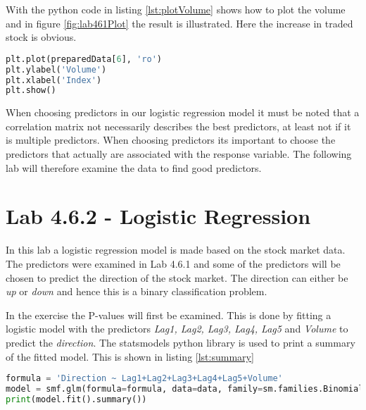 \FloatBarrier

With the python code in listing \ref{lst:plotVolume} shows how to plot the volume and in figure \ref{fig:lab461Plot} the result is illustrated. Here the increase in traded stock is obvious.
\begin{lstlisting}[language=Python, label=lst:plotVolume, caption=Plot Volume]
plt.plot(preparedData[6], 'ro')
plt.ylabel('Volume')
plt.xlabel('Index')
plt.show()
\end{lstlisting}


When choosing predictors in our logistic regression model it must be noted that a correlation matrix not necessarily describes the best predictors, at least not if it is multiple predictors. When choosing predictors its important to choose the predictors that actually are associated with the response variable. The following lab will therefore examine the data to find good predictors.

\section{Lab 4.6.2 - Logistic Regression}
\label{sec:lab462}
In this lab a logistic regression model is made based on the stock market data. The predictors were examined in Lab 4.6.1 and some of the predictors will be chosen to predict the direction of the stock market. The direction can either be \emph{up} or \emph{down} and hence this is a binary classification problem.

In the exercise the P-values will first be examined. This is done by fitting a logistic model with the predictors \emph{Lag1, Lag2, Lag3, Lag4, Lag5} and \emph{Volume} to predict the \emph{direction}. The statsmodels python library is used to print a summary of the fitted model. This is shown in listing \ref{lst:summary}
\begin{lstlisting}[language=Python, label=lst:summary, caption=Print summary]
formula = 'Direction ~ Lag1+Lag2+Lag3+Lag4+Lag5+Volume'
model = smf.glm(formula=formula, data=data, family=sm.families.Binomial())
print(model.fit().summary())
\end{lstlisting}

\FloatBarrier

